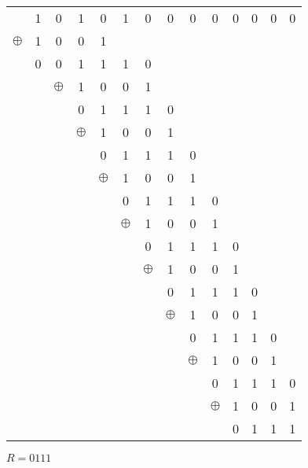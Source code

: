 \documentclass[12pt, a4paper]{article}
\begin{document}
\begin{enumerate}[a]
	\begin{tabular}{cccccccccccccc}
		& 1 & 0 & 1 & 0 & 1 & 0 & 0 & 0 & 0 & 0 & 0 & 0 & 0\\
		$\oplus$ & 1 & 0 & 0 & 1\\\cline{2-5}
		& 0 & 0 & 1 & 1 & 1 & 0\\
		&& $\oplus$ & 1 & 0 & 0 & 1\\\cline{4-7}
		&&& 0 & 1 & 1 & 1 & 0\\
		&&& $\oplus$ & 1 & 0 & 0 & 1\\\cline{5-8}
		&&&& 0 & 1 & 1 & 1 & 0\\
		&&&& $\oplus$ & 1 & 0 & 0 & 1\\\cline{6-9}
		&&&&& 0 & 1 & 1 & 1 & 0\\
		&&&&& $\oplus$ & 1 & 0 & 0 & 1\\\cline{7-10}
		&&&&&& 0 & 1 & 1 & 1 & 0\\
		&&&&&& $\oplus$ & 1 & 0 & 0 & 1\\\cline{8-11}
		&&&&&&& 0 & 1 & 1 & 1 & 0\\
		&&&&&&& $\oplus$ & 1 & 0 & 0 & 1\\\cline{9-12}
		&&&&&&&& 0 & 1 & 1 & 1 & 0\\
		&&&&&&&& $\oplus$ & 1 & 0 & 0 & 1\\\cline{10-13}
		&&&&&&&&& 0 & 1 & 1 & 1 & 0\\
		&&&&&&&&& $\oplus$ & 1 & 0 & 0 & 1\\\cline{11-14}
		&&&&&&&&&& 0 & 1 & 1 & 1\\
	\end{tabular}

	$R = 0111$
\end{enumerate}
\end{document}
